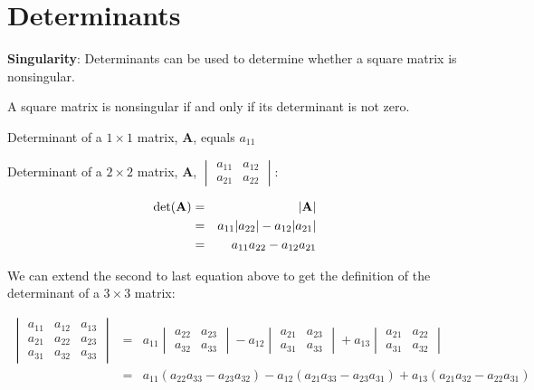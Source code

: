 \documentclass[
]{book}
\theoremstyle{definition}
\theoremstyle{definition}
\theoremstyle{definition}
\theoremstyle{definition}
\theoremstyle{remark}
\begin{document}
\hypertarget{determinants}{%
\section{Determinants}\label{determinants}}

\textbf{Singularity}: Determinants can be used to determine whether a square matrix is nonsingular.

A square matrix is nonsingular if and only if its determinant is not zero.

Determinant of a \(1 \times 1\) matrix, \textbf{A}, equals \(a_{11}\)

Determinant of a \(2 \times 2\) matrix, \textbf{A},
\(\begin{vmatrix} a_{11}&a_{12}\\  a_{21}&a_{22} \end{vmatrix}\):

\begin{eqnarray*}
\det({\bf A}) &=& |{\bf A}|\\
            &=& a_{11}|a_{22}| - a_{12}|a_{21}|\\
            &=& a_{11}a_{22} - a_{12}a_{21}
\end{eqnarray*}

We can extend the second to last equation above to get the definition of the determinant of a \(3 \times 3\) matrix:

\begin{eqnarray*}
            \begin{vmatrix} a_{11}&a_{12}&a_{13}\\  a_{21} & a_{22}&a_{23}\\ a_{31}&a_{32}&a_{33} \end{vmatrix} 
                &=& 
                a_{11} \begin{vmatrix} a_{22}&a_{23}\\ a_{32}&a_{33} \end{vmatrix}
                - a_{12} \begin{vmatrix} a_{21}&a_{23}\\ a_{31}&a_{33} \end{vmatrix}
                + a_{13} \begin{vmatrix} a_{21}&a_{22}\\ a_{31}&a_{32} 
                \end{vmatrix}\\
                &=& a_{11}(a_{22}a_{33} - a_{23}a_{32}) - a_{12}(a_{21}a_{33} - a_{23}a_{31}) + a_{13}(a_{21}a_{32} - a_{22}a_{31})
\end{eqnarray*}
\end{document}
